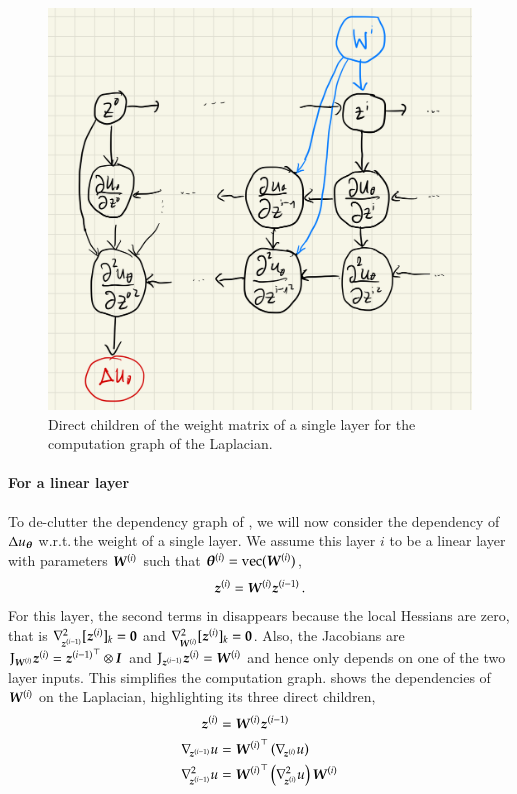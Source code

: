 \begin{figure}[t]
  \centering
  \includegraphics[width=0.6\linewidth]{figures/HBP_graph_weight.png}
  \caption{Direct children of the weight matrix of a single layer for the computation graph of the Laplacian.}\label{fig:laplacian-graph-weight}
\end{figure}

\paragraph{For a linear layer} To de-clutter the dependency graph of , we will now consider the dependency of $\Delta u_{{\boldsymbol{\theta}}}$ w.r.t.\,the weight of a single layer.
We assume this layer $i$ to be a linear layer with parameters ${\boldsymbol{W}}^{(i)}$ such that ${\boldsymbol{\theta}}^{(i)} = \operatorname{vec}({\boldsymbol{W}}^{(i)})$,
\begin{align}
  {\boldsymbol{z}}^{(i)} = {\boldsymbol{W}}^{(i)} {\boldsymbol{z}}^{(i-1)}\,.
\end{align}
For this layer, the second terms in  disappears because the local Hessians are zero, that is $\nabla_{\!{{\boldsymbol{z}}^{(i-1)}}}^{2}[{\boldsymbol{z}}^{(i)}]_k = {\boldsymbol{0}}$ and $\nabla_{\!{{\boldsymbol{W}}^{(i)}}}^{2}[{\boldsymbol{z}}^{(i)}]_k = {\boldsymbol{0}}$.
Also, the Jacobians are $\mathrm{J}_{{\boldsymbol{W}}^{(i)}}{\boldsymbol{z}}^{(i)} = {{\boldsymbol{z}}^{(i-1)}}^{\top} \otimes {\boldsymbol{I}}$ and $\mathrm{J}_{{\boldsymbol{z}}^{(i-1)}}{\boldsymbol{z}}^{(i)} = {\boldsymbol{W}}^{(i)}$ and hence only depends on one of the two layer inputs.
This simplifies the computation graph.
 shows the dependencies of ${\boldsymbol{W}}^{(i)}$ on the
Laplacian, highlighting its three direct children,
\begin{align}
  \begin{split}
    {\boldsymbol{z}}^{(i)}
    &=
      {\boldsymbol{W}}^{(i)} {\boldsymbol{z}}^{(i-1)}
    \\
    \nabla_{\!{{\boldsymbol{z}}^{(i-1)}}}u
    &=
      {{\boldsymbol{W}}^{(i)}}^{\top}
      \left(
      \nabla_{\!{{\boldsymbol{z}}^{(i)}}}u
      \right)
    \\
    \nabla_{\!{{\boldsymbol{z}}^{(i-1)}}}^{2}u
    &=
      {{\boldsymbol{W}}^{(i)}}^{\top}
      \left(
      \nabla_{\!{{\boldsymbol{z}}^{(i)}}}^{2}u
      \right)
      {\boldsymbol{W}}^{(i)}
  \end{split}
\end{align}

